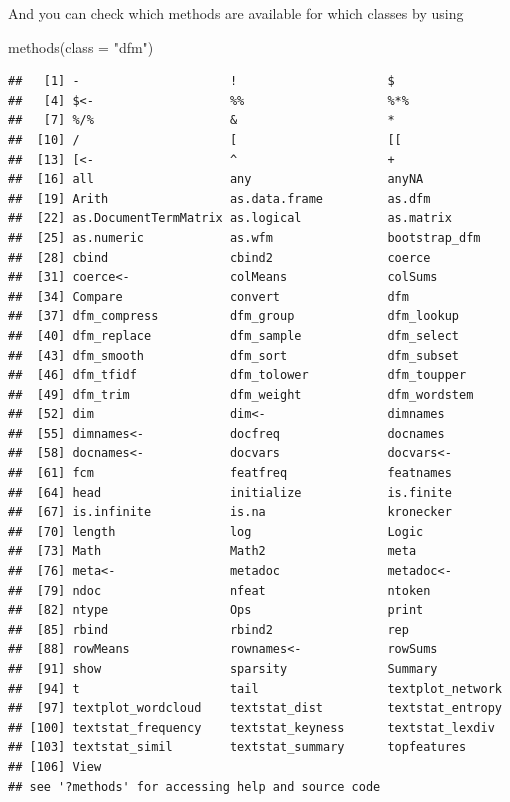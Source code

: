 \documentclass[
]{book}
\newenvironment{Shaded}{\begin{snugshade}}{\end{snugshade}}
\newcommand{\AttributeTok}[1]{\textcolor[rgb]{0.77,0.63,0.00}{#1}}
\newcommand{\FunctionTok}[1]{\textcolor[rgb]{0.00,0.00,0.00}{#1}}
\newcommand{\NormalTok}[1]{#1}
\newcommand{\StringTok}[1]{\textcolor[rgb]{0.31,0.60,0.02}{#1}}
\begin{document}
And you can check which methods are available for which classes by using

\begin{Shaded}
\begin{Highlighting}[]
\FunctionTok{methods}\NormalTok{(}\AttributeTok{class =} \StringTok{"dfm"}\NormalTok{)}
\end{Highlighting}
\end{Shaded}

\begin{verbatim}
##   [1] -                     !                     $                    
##   [4] $<-                   %%                    %*%                  
##   [7] %/%                   &                     *                    
##  [10] /                     [                     [[                   
##  [13] [<-                   ^                     +                    
##  [16] all                   any                   anyNA                
##  [19] Arith                 as.data.frame         as.dfm               
##  [22] as.DocumentTermMatrix as.logical            as.matrix            
##  [25] as.numeric            as.wfm                bootstrap_dfm        
##  [28] cbind                 cbind2                coerce               
##  [31] coerce<-              colMeans              colSums              
##  [34] Compare               convert               dfm                  
##  [37] dfm_compress          dfm_group             dfm_lookup           
##  [40] dfm_replace           dfm_sample            dfm_select           
##  [43] dfm_smooth            dfm_sort              dfm_subset           
##  [46] dfm_tfidf             dfm_tolower           dfm_toupper          
##  [49] dfm_trim              dfm_weight            dfm_wordstem         
##  [52] dim                   dim<-                 dimnames             
##  [55] dimnames<-            docfreq               docnames             
##  [58] docnames<-            docvars               docvars<-            
##  [61] fcm                   featfreq              featnames            
##  [64] head                  initialize            is.finite            
##  [67] is.infinite           is.na                 kronecker            
##  [70] length                log                   Logic                
##  [73] Math                  Math2                 meta                 
##  [76] meta<-                metadoc               metadoc<-            
##  [79] ndoc                  nfeat                 ntoken               
##  [82] ntype                 Ops                   print                
##  [85] rbind                 rbind2                rep                  
##  [88] rowMeans              rownames<-            rowSums              
##  [91] show                  sparsity              Summary              
##  [94] t                     tail                  textplot_network     
##  [97] textplot_wordcloud    textstat_dist         textstat_entropy     
## [100] textstat_frequency    textstat_keyness      textstat_lexdiv      
## [103] textstat_simil        textstat_summary      topfeatures          
## [106] View                 
## see '?methods' for accessing help and source code
\end{verbatim}
\end{document}
